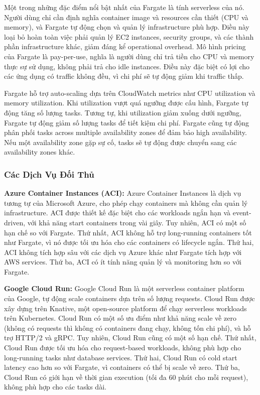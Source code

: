 Một trong những đặc điểm nổi bật nhất của Fargate là tính serverless của nó. Người dùng chỉ cần định nghĩa container image và resources cần thiết (CPU và memory), và Fargate tự động chọn và quản lý infrastructure phù hợp. Điều này loại bỏ hoàn toàn việc phải quản lý EC2 instances, security groups, và các thành phần infrastructure khác, giảm đáng kể operational overhead. Mô hình pricing của Fargate là pay-per-use, nghĩa là người dùng chỉ trả tiền cho CPU và memory thực sự sử dụng, không phải trả cho idle instances. Điều này đặc biệt có lợi cho các ứng dụng có traffic không đều, vì chi phí sẽ tự động giảm khi traffic thấp.

Fargate hỗ trợ auto-scaling dựa trên CloudWatch metrics như CPU utilization và memory utilization. Khi utilization vượt quá ngưỡng được cấu hình, Fargate tự động tăng số lượng tasks. Tương tự, khi utilization giảm xuống dưới ngưỡng, Fargate tự động giảm số lượng tasks để tiết kiệm chi phí. Fargate cũng tự động phân phối tasks across multiple availability zones để đảm bảo high availability. Nếu một availability zone gặp sự cố, tasks sẽ tự động được chuyển sang các availability zones khác.

\subsubsection{Các Dịch Vụ Đối Thủ}

\textbf{Azure Container Instances (ACI):} Azure Container Instances là dịch vụ tương tự của Microsoft Azure, cho phép chạy containers mà không cần quản lý infrastructure. ACI được thiết kế đặc biệt cho các workloads ngắn hạn và event-driven, với khả năng start containers trong vài giây. Tuy nhiên, ACI có một số hạn chế so với Fargate. Thứ nhất, ACI không hỗ trợ long-running containers tốt như Fargate, vì nó được tối ưu hóa cho các containers có lifecycle ngắn. Thứ hai, ACI không tích hợp sâu với các dịch vụ Azure khác như Fargate tích hợp với AWS services. Thứ ba, ACI có ít tính năng quản lý và monitoring hơn so với Fargate.

\textbf{Google Cloud Run:} Google Cloud Run là một serverless container platform của Google, tự động scale containers dựa trên số lượng requests. Cloud Run được xây dựng trên Knative, một open-source platform để chạy serverless workloads trên Kubernetes. Cloud Run có một số ưu điểm như khả năng scale về zero (không có requests thì không có containers đang chạy, không tốn chi phí), và hỗ trợ HTTP/2 và gRPC. Tuy nhiên, Cloud Run cũng có một số hạn chế. Thứ nhất, Cloud Run được tối ưu hóa cho request-based workloads, không phù hợp cho long-running tasks như database services. Thứ hai, Cloud Run có cold start latency cao hơn so với Fargate, vì containers có thể bị scale về zero. Thứ ba, Cloud Run có giới hạn về thời gian execution (tối đa 60 phút cho mỗi request), không phù hợp cho các tasks dài.

